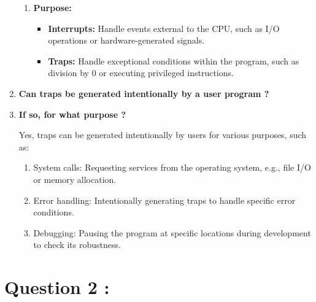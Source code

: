 \documentclass{article}
\begin{document}
\begin{enumerate}[label=(\alph*)]
\begin{enumerate}[label=\roman*)]
        \item \textbf{Purpose:}
        \begin{itemize}
            \item \textbf{Interrupts:} Handle events external to the CPU, such as I/O operations or hardware-generated signals.
            \item \textbf{Traps:} Handle exceptional conditions within the program, such as division by 0 or executing privileged instructions.
        \end{itemize}
    \end{enumerate}

    \item \textbf{Can traps be generated intentionally by a user program ?}
    \item \textbf{If so, for what purpose ?}
    
    Yes, traps can be generated intentionally by users for various purposes, such as:
    \begin{enumerate}[label=\roman*)]
        \item System calls: Requesting services from the operating system, e.g., file I/O or memory allocation.
        \item Error handling: Intentionally generating traps to handle specific error conditions.
        \item Debugging: Pausing the program at specific locations during development to check its robustness.
    \end{enumerate}
\end{enumerate}

\section*{Question 2 :}
\end{document}
